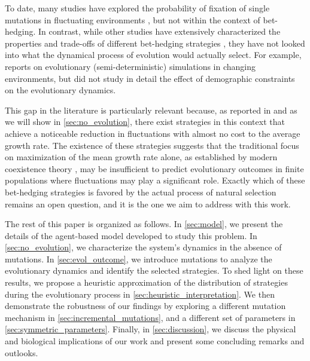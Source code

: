 \documentclass[aps,pre,reprint,10pt,superscriptaddress]{revtex4-2}
\begin{document}
To date, many studies have explored the probability of fixation of single mutations in fluctuating environments \cite{ashcroftFixationFinitePopulations2014,saakianAlleleFixationProbability2019,kaushikTimeFixationChanging2021,askerFixationExtinctionTimefluctuating2025,liuParrondolikeEvolutionaryAdvantage2026}, but not within the context of bet-hedging. In contrast, while other studies have extensively characterized the properties and trade-offs of different bet-hedging strategies \cite{kussellPhenotypicDiversityPopulation2005,beleteOptimalityAdaptationPhenotypically2015,huftonPhenotypicSwitchingPopulations2018,villamartinBethedgingStrategiesExpanding2019,dinisParetooptimalTradeoffPhenotypic2022}, they have not looked into what the dynamical process of evolution would actually select. For example, \cite{patraEmergencePhenotypeSwitching2015} reports on evolutionary (semi-deterministic) simulations in changing environments, but did not study in detail the effect of demographic constraints on the evolutionary dynamics.

This gap in the literature is particularly relevant because, as reported in \cite{dinisPhaseTransitionsOptimal2020,dinisParetooptimalTradeoffPhenotypic2022} and as we will show in \cref{sec:no_evolution}, there exist strategies in this context that achieve a noticeable reduction in fluctuations with almost no cost to the average growth rate. The existence of these strategies suggests that the traditional focus on maximization of the mean growth rate alone, as established by modern coexistence theory \cite{chessonMultispeciesCompetitionVariable1994,barabasChessonsCoexistenceTheory2018}, may be insufficient to predict evolutionary outcomes in finite populations where fluctuations may play a significant role. Exactly which of these bet-hedging strategies is favored by the actual process of natural selection remains an open question, and it is the one we aim to address with this work.

The rest of this paper is organized as follows. In \cref{sec:model}, we present the details of the agent-based model developed to study this problem. In \cref{sec:no_evolution}, we characterize the system's dynamics in the absence of mutations. In \cref{sec:evol_outcome}, we introduce mutations to analyze the evolutionary dynamics and identify the selected strategies. To shed light on these results, we propose a heuristic approximation of the distribution of strategies during the evolutionary process in \cref{sec:heuristic_interpretation}. We then demonstrate the robustness of our findings by exploring a different mutation mechanism in \cref{sec:incremental_mutations}, and a different set of parameters in \cref{sec:symmetric_parameters}. Finally, in \cref{sec:discussion}, we discuss the physical and biological implications of our work and present some concluding remarks and outlooks.
\end{document}
